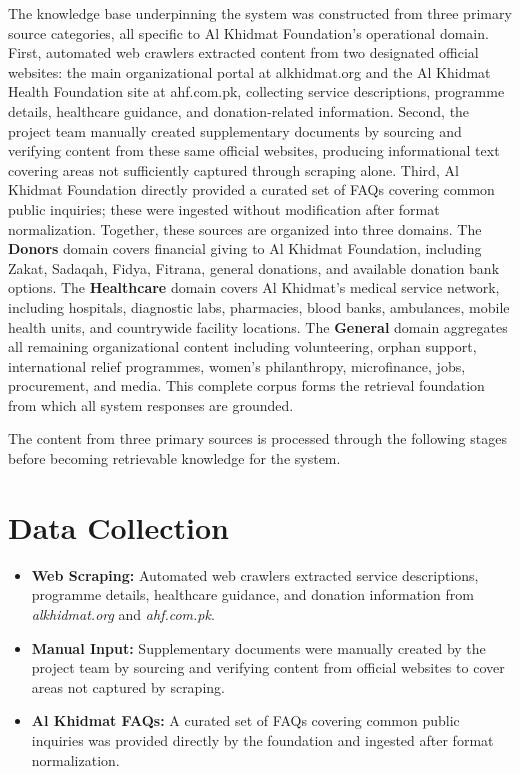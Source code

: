 The knowledge base underpinning the system was constructed from three primary source categories, all specific to Al Khidmat 
Foundation's operational domain. First, automated web crawlers extracted content from two designated official websites: the main 
organizational portal at alkhidmat.org and the Al Khidmat Health Foundation site at ahf.com.pk, collecting service descriptions, 
programme details, healthcare guidance, and donation-related information. Second, the project team manually created supplementary 
documents by sourcing and verifying content from these same official websites, producing informational text covering areas not 
sufficiently captured through scraping alone. Third, Al Khidmat Foundation directly provided a curated set of FAQs covering 
common public inquiries; these were ingested without modification after format normalization. Together, these sources are 
organized into three domains. The \textbf{Donors} domain covers financial giving to Al Khidmat Foundation, including Zakat, Sadaqah, 
Fidya, Fitrana, general donations, and available donation bank options. The \textbf{Healthcare} domain covers Al Khidmat's medical service 
network, including hospitals, diagnostic labs, pharmacies, blood banks, ambulances, mobile health units, and countrywide facility 
locations. The \textbf{General} domain aggregates all remaining organizational content including volunteering, orphan support, 
international relief programmes, women's philanthropy, microfinance, jobs, procurement, and media. This complete corpus forms 
the retrieval foundation from which all system responses are grounded. 

The content from three primary sources is processed through the following stages before becoming retrievable knowledge for the system. 
\section*{Data Collection}
\begin{itemize}\setlength{\itemsep}{0pt}
    \item \textbf{Web Scraping:} Automated web crawlers extracted service descriptions, programme details, healthcare guidance, and donation information from \textit{alkhidmat.org} and \textit{ahf.com.pk}.
    \item \textbf{Manual Input:} Supplementary documents were manually created by the project team by sourcing and verifying content from official websites to cover areas not captured by scraping.
    \item \textbf{Al Khidmat FAQs:} A curated set of FAQs covering common public inquiries was provided directly by the foundation and ingested after format normalization.
\end{itemize}

